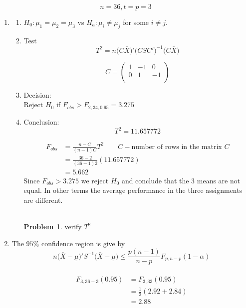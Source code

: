 \documentclass[11pt,a4paper]{article}
\theoremstyle{definition}
\newtheorem{problemx}{Problem}[section]
\newenvironment{problem}{\begin{problemx}}{\end{problemx}}
\begin{document}
$$n=36,  t=p=3$$



\begin{enumerate}
\item 
\begin{enumerate}
     \item[$-$] $H_0: \mu_1 = \mu_2 = \mu_3$ vs $H_a: \mu_i \neq \mu_j$ for some $i\neq j$.
     
     \item[$-$] Test $$T^2=n\big(C\overline{X}\big)'\big(CSC'\big)^{-1}\big(C\overline{X}\big)$$
          
     $$C=\begin{pmatrix}
     1 & -1 & 0\\
     0 & 1 & -1\\
     \end{pmatrix}$$
     
     \item[$-$] Decision:\\
     Reject $H_0$ if $F_{obs}>F_{2,34,0.95}=3.275$
     
     \item[$-$] Conclusion: 
      $$T^2 = 11.657772$$
      
 \begin{align*}
 F_{obs} & = \frac{n-C}{(n-1)C}T^2\qquad  C- \text{number of rows in the matrix } C\\
         & = \frac{36-2}{(36-1)2}(11.657772)\\
         & = 5.662
 \end{align*}
Since $F_{obs} > 3.275$ we reject $H_0$ and conclude that the 3 means are not equal. In other terms the average performance in the three assignments are different.\\\\
\begin{problem}
verify $T^2$\\
\end{problem}
\end{enumerate}

\item The $95\%$ confidence region is give by $$ n\big(\overline{X}-\underline{\mu}\big)'S^{-1}\big(\overline{X}-\underline{\mu}\big) \leq \frac{p(n-1)}{n-p}F_{p,n-p}(1-\alpha)$$\\

\begin{align*}
F_{3,36-3}(0.95) & = F_{3,33}(0.95)\\
                 & = \frac{1}{2}(2.92+2.84)\\
                 & = 2.88\\
\end{align*}


\end{enumerate}
\end{document}
